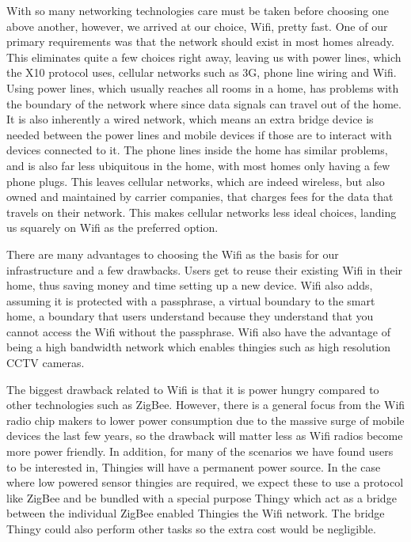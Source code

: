 \documentclass{ubicomp2012}
\begin{document}
With so many networking technologies care must be taken before choosing one above another, however, we arrived at our choice, Wifi, pretty fast. One of our primary requirements was that the network should exist in most homes already. This eliminates quite a few choices right away, leaving us with power lines, which the X10 protocol uses, cellular networks such as 3G, phone line wiring and Wifi. Using power lines, which usually reaches all rooms in a home, has problems with the boundary of the network where since data signals can travel out of the home. It is also inherently a wired network, which means an extra bridge device is needed between the power lines and mobile devices if those are to interact with devices connected to it. The phone lines inside the home has similar problems, and is also far less ubiquitous in the home, with most homes only having a few phone plugs. This leaves cellular networks, which are indeed wireless, but also owned and maintained by carrier companies, that charges fees for the data that travels on their network. This makes cellular networks less ideal choices, landing us squarely on Wifi as the preferred option.

There are many advantages to choosing the Wifi as the basis for our infrastructure and a few drawbacks. Users get to reuse their existing Wifi in their home, thus saving money and time setting up a new device. Wifi also adds, assuming it is protected with a passphrase, a virtual boundary to the smart home, a boundary that users understand because they understand that you cannot access the Wifi without the passphrase. Wifi also have the advantage of being a high bandwidth network which enables thingies such as high resolution CCTV cameras.

The biggest drawback related to Wifi is that it is power hungry compared to other technologies such as ZigBee. However, there is a general focus from the Wifi radio chip makers to lower power consumption due to the massive surge of mobile devices the last few years, so the drawback will matter less as Wifi radios become more power friendly. In addition, for many of the scenarios we have found users to be interested in, Thingies will have a permanent power source. In the case where low powered sensor thingies are required, we expect these to use a protocol like ZigBee\cite{zigbeeWebsite} and be bundled with a special purpose Thingy which act as a bridge between the individual ZigBee enabled Thingies the Wifi network. The bridge Thingy could also perform other tasks so the extra cost would be negligible.
\end{document}
